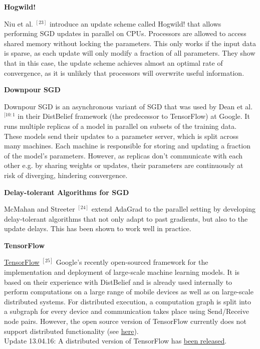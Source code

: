 \documentclass[4pt,journal,compsoc]{IEEEtran}
\begin{document}
\begin{flushleft}
    \textbf{\Large Hogwild!} \newline
    
    Niu et al. $^ {[23]}$ introduce an update scheme called Hogwild! that allows performing SGD updates in parallel on CPUs. Processors are allowed to access shared memory without locking the parameters. This only works if the input data is sparse, as each update will only modify a fraction of all parameters. They show that in this case, the update scheme achieves almost an optimal rate of convergence, as it is unlikely that processors will overwrite useful information. \newline \newline
    
    \textbf{\Large Downpour SGD} \newline
    
    Downpour SGD is an asynchronous variant of SGD that was used by Dean et al. $^ {[10:1}$ in their DistBelief framework (the predecessor to TensorFlow) at Google. It runs multiple replicas of a model in parallel on subsets of the training data. These models send their updates to a parameter server, which is split across many machines. Each machine is responsible for storing and updating a fraction of the model's parameters. However, as replicas don't communicate with each other e.g. by sharing weights or updates, their parameters are continuously at risk of diverging, hindering convergence. \newline \newline
    
    \textbf{\Large Delay-tolerant Algorithms for SGD} \newline
    
    McMahan and Streeter $^ {[24]}$ extend AdaGrad to the parallel setting by developing delay-tolerant algorithms that not only adapt to past gradients, but also to the update delays. This has been shown to work well in practice. \newline \newline
    
    \textbf{\Large TensorFlow} \newline
    
    \underline{TensorFlow} $^ {[25]}$ Google's recently open-sourced framework for the implementation and deployment of large-scale machine learning models. It is based on their experience with DistBelief and is already used internally to perform computations on a large range of mobile devices as well as on large-scale distributed systems. For distributed execution, a computation graph is split into a subgraph for every device and communication takes place using Send/Receive node pairs. However, the open source version of TensorFlow currently does not support distributed functionality (see \underline{here}). \\
    Update 13.04.16: A distributed version of TensorFlow has \underline{been released}. \newline \newline
    

\end{flushleft}
\end{document}

